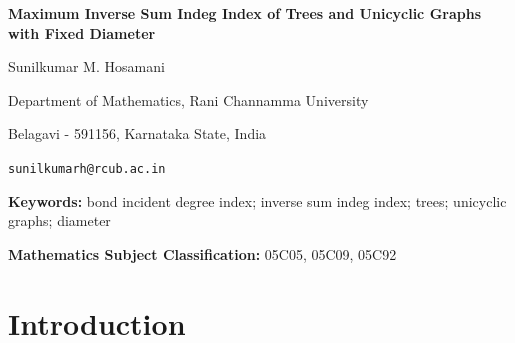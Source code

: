 \documentclass[12pt]{article}
\theoremstyle{definition}
\newcommand{\BID}{\operatorname{BID}}
\begin{document}
\begin{center}
    {\LARGE \textbf{Maximum Inverse Sum Indeg Index of Trees and Unicyclic Graphs with Fixed Diameter}}
    
    \vspace{1cm}
    
    {\large Sunilkumar M. Hosamani}
    
    {\large Department of Mathematics, Rani Channamma University}
    
    {\large Belagavi - 591156, Karnataka State, India}
    
    {\large \texttt{sunilkumarh@rcub.ac.in}}
    
    \vspace{1cm}
    
    {\large }
    
    \vspace{1cm}
\end{center}

\begin{abstract}
The bond incident degree (BID) index of a graph \(G\) is defined as 
\(\BID(G) = \sum_{u_1u_2\in E(G)} f(d(u_1), d(u_2))\), where \(f(x,y)=f(y,x)\) is a real-valued function. 
In this paper, using graph transformation methods, we establish the maximum bond incident degree indices 
of trees and unicyclic graphs with a fixed diameter for the inverse sum indeg (ISI) index. 
The ISI index corresponds to the function \(f(x,y) = \frac{xy}{x+y}\). We prove that for trees 
\(T \in \mathbb{T}_{n,d}\) with \(d \geq 3\) and \(n \geq d+3\), the maximum ISI index is attained 
by the tree \(T_{n,d}^*\). For unicyclic graphs, we characterize the extremal graphs for diameters 
\(d=2\), \(d=3\), and \(d \geq 4\). Specifically, the maximum ISI index is achieved by \(S_n^+\) for 
\(d=2\), by \(C_n^*\) for \(d=3\), and by \(\mathcal{U}_{n,d}\) for \(d \geq 4\). 
\end{abstract}

\noindent\textbf{Keywords:} bond incident degree index; inverse sum indeg index; trees; unicyclic graphs; diameter

\noindent\textbf{Mathematics Subject Classification:} 05C05, 05C09, 05C92

\section{Introduction}
\end{document}
